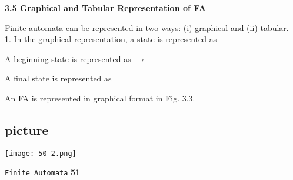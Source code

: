 \documentclass{article}
\begin{document}
\large{
\textbf{3.5 Graphical and Tabular Representation of FA}\\
}
\vspace*{0.2cm}

Finite automata can be represented in two ways: (i) graphical and (ii) tabular.\\

1. In the graphical representation, a state is represented as

\hspace*{0.4cm} A beginning state is represented as $\rightarrow$


\hspace*{0.4cm} A final state is represented as

\vspace*{0.2cm}
\hspace*{0.4cm} An FA is represented in graphical format in Fig. 3.3.\\

\begin{center}
\section{picture}
\texttt{[image: 50-2.png]}
\end{center}

\newpage
\begin{flushright}
 \texttt{Finite Automata} \hspace*{1cm} \textbf{51}
\end{flushright}
\end{document}
